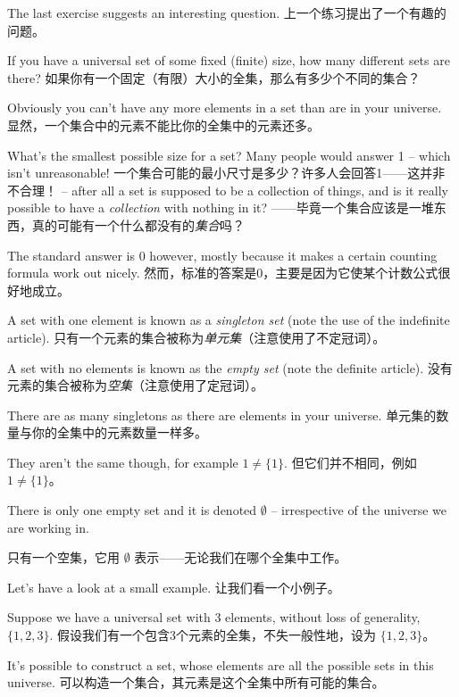 The last exercise suggests an interesting question.
上一个练习提出了一个有趣的问题。

If you have 
a universal set of some fixed (finite) size, how many different sets
are there?
如果你有一个固定（有限）大小的全集，那么有多少个不同的集合？

Obviously you can't have any more elements in a set than
are in your universe.
显然，一个集合中的元素不能比你的全集中的元素还多。

What's the smallest possible size for a set?
Many people would answer 1 -- which isn't unreasonable!
一个集合可能的最小尺寸是多少？许多人会回答1——这并非不合理！
-- after all
a set is supposed to be a collection of things, and is it really possible
to have a \emph{collection} with nothing in it?
——毕竟一个集合应该是一堆东西，真的可能有一个什么都没有的\emph{集合}吗？

The standard answer is
0 however, mostly because it makes a certain counting formula work out
nicely.
然而，标准的答案是0，主要是因为它使某个计数公式很好地成立。

A set with one element is known as a 
\emph{singleton set} 
(note the use of the indefinite article).
只有一个元素的集合被称为\emph{单元集}（注意使用了不定冠词）。

A set with no elements
is known as the 
\emph{empty set} (note the definite article).
没有元素的集合被称为\emph{空集}（注意使用了定冠词）。

There
are as many singletons as there are elements in your universe.
单元集的数量与你的全集中的元素数量一样多。

They
aren't the same though, for example $1 \neq \{ 1 \}$.
但它们并不相同，例如 $1 \neq \{ 1 \}$。

There is 
only one empty set and it is denoted $\emptyset$ -- irrespective of the
universe we are working in.

只有一个空集，它用 $\emptyset$ 表示——无论我们在哪个全集中工作。

Let's have a look at a small example.
让我们看一个小例子。

Suppose we have a universal set
with 3 elements, without loss of generality, $\{1, 2, 3\}$.
假设我们有一个包含3个元素的全集，不失一般性地，设为 $\{1, 2, 3\}$。

It's 
possible to construct a set, whose elements are all the possible sets
in this universe.
可以构造一个集合，其元素是这个全集中所有可能的集合。

